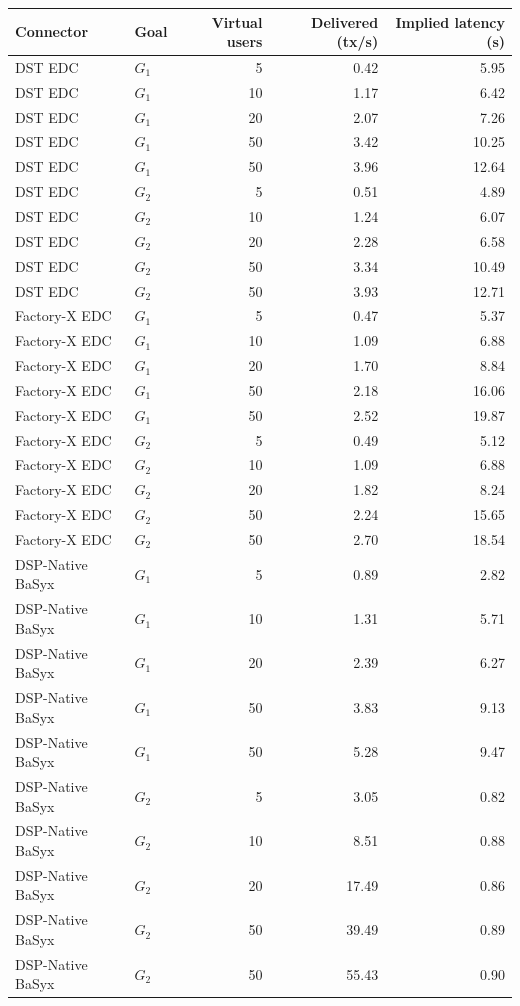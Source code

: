 \begin{tabular}{llrrr}
    \toprule
    Connector & Goal & Virtual users & Delivered (tx/s) & Implied latency (s) \\
    \midrule
    DST EDC & $G_1$ & 5 & 0.42 & 5.95 \\
    DST EDC & $G_1$ & 10 & 1.17 & 6.42 \\
    DST EDC & $G_1$ & 20 & 2.07 & 7.26 \\
    DST EDC & $G_1$ & 50 & 3.42 & 10.25 \\
    DST EDC & $G_1$ & 50 & 3.96 & 12.64 \\
    DST EDC & $G_2$ & 5 & 0.51 & 4.89 \\
    DST EDC & $G_2$ & 10 & 1.24 & 6.07 \\
    DST EDC & $G_2$ & 20 & 2.28 & 6.58 \\
    DST EDC & $G_2$ & 50 & 3.34 & 10.49 \\
    DST EDC & $G_2$ & 50 & 3.93 & 12.71 \\
    Factory-X EDC & $G_1$ & 5 & 0.47 & 5.37 \\
    Factory-X EDC & $G_1$ & 10 & 1.09 & 6.88 \\
    Factory-X EDC & $G_1$ & 20 & 1.70 & 8.84 \\
    Factory-X EDC & $G_1$ & 50 & 2.18 & 16.06 \\
    Factory-X EDC & $G_1$ & 50 & 2.52 & 19.87 \\
    Factory-X EDC & $G_2$ & 5 & 0.49 & 5.12 \\
    Factory-X EDC & $G_2$ & 10 & 1.09 & 6.88 \\
    Factory-X EDC & $G_2$ & 20 & 1.82 & 8.24 \\
    Factory-X EDC & $G_2$ & 50 & 2.24 & 15.65 \\
    Factory-X EDC & $G_2$ & 50 & 2.70 & 18.54 \\
    DSP-Native BaSyx & $G_1$ & 5 & 0.89 & 2.82 \\
    DSP-Native BaSyx & $G_1$ & 10 & 1.31 & 5.71 \\
    DSP-Native BaSyx & $G_1$ & 20 & 2.39 & 6.27 \\
    DSP-Native BaSyx & $G_1$ & 50 & 3.83 & 9.13 \\
    DSP-Native BaSyx & $G_1$ & 50 & 5.28 & 9.47 \\
    DSP-Native BaSyx & $G_2$ & 5 & 3.05 & 0.82 \\
    DSP-Native BaSyx & $G_2$ & 10 & 8.51 & 0.88 \\
    DSP-Native BaSyx & $G_2$ & 20 & 17.49 & 0.86 \\
    DSP-Native BaSyx & $G_2$ & 50 & 39.49 & 0.89 \\
    DSP-Native BaSyx & $G_2$ & 50 & 55.43 & 0.90 \\
    \bottomrule
\end{tabular}
